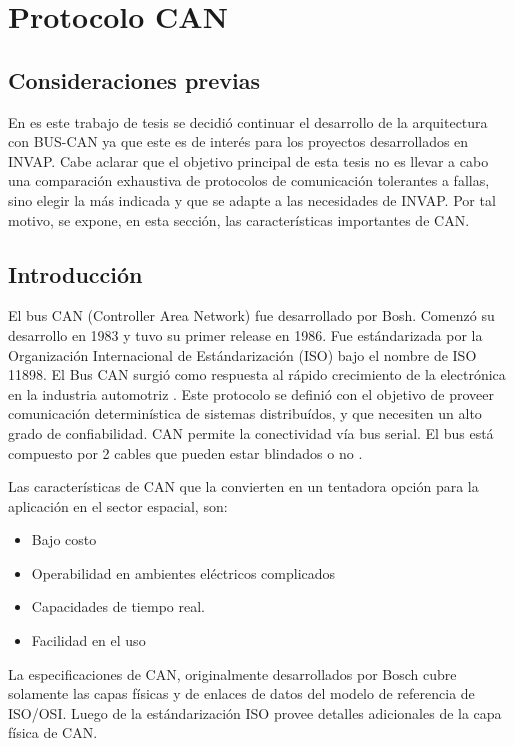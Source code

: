 \section{Protocolo CAN} \label{seccion:ProtocoloCAN}
\subsection{Consideraciones previas}
En es este trabajo de tesis se decidió continuar el desarrollo de la arquitectura con BUS-CAN ya que este es de interés para los proyectos desarrollados en INVAP. Cabe aclarar que el objetivo principal de esta tesis no es llevar a cabo una comparación exhaustiva de protocolos de comunicación tolerantes a fallas, sino elegir la más indicada y que se adapte a las necesidades de INVAP. Por tal motivo, se expone, en esta sección, las características importantes de CAN.

\subsection{Introducción}
El bus CAN (Controller Area Network) fue desarrollado por Bosh. Comenzó su desarrollo en 1983 y tuvo su primer release en 1986. Fue estándarizada por la Organización Internacional de Estándarización (ISO) bajo el nombre de  ISO 11898. El Bus CAN surgió como respuesta al rápido crecimiento de la electrónica en la industria automotriz \citep{esdWEB}. Este protocolo se definió con el objetivo de proveer comunicación determinística de sistemas distribuídos, y que necesiten un alto grado de confiabilidad. CAN permite la conectividad vía bus serial. El bus está compuesto por  2 cables que pueden estar blindados o no \citep{esdWEB}.

Las características de CAN que la convierten en un tentadora opción para la aplicación en el sector espacial, son:
\begin{itemize}
  \item Bajo costo
  \item Operabilidad en ambientes eléctricos complicados
  \item Capacidades de tiempo real.
  \item Facilidad en el uso
\end{itemize}

La especificaciones de CAN, originalmente desarrollados por Bosch cubre solamente las capas físicas y de enlaces de datos del modelo de referencia de ISO/OSI. Luego de la estándarización ISO provee detalles adicionales de la capa física de CAN.

